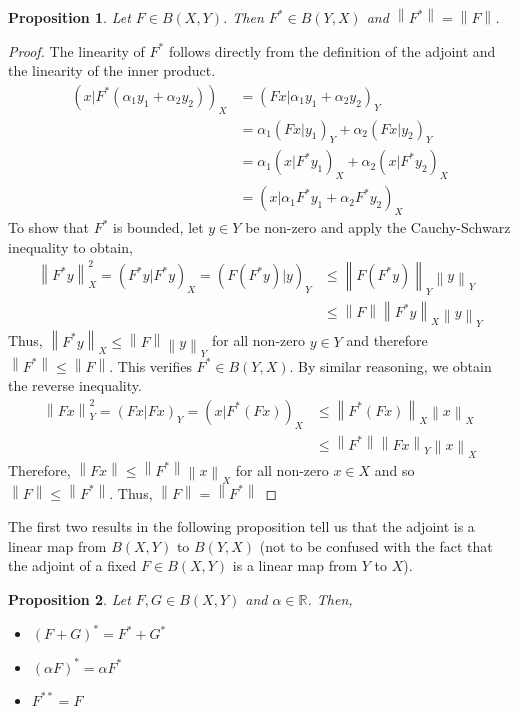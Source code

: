 \documentclass[12pt]{article}
\newcommand*{\norm}[1]{\left\lVert#1\right\rVert}
\newtheorem{prop}{Proposition}
\begin{document}
\begin{prop} 
Let $F \in B(X, Y)$. Then $F^* \in B(Y, X)$ and $\norm{F^*} = \norm{F}$. 
\end{prop}

\begin{proof} 
The linearity of $F^*$ follows directly from the definition of the adjoint and the linearity of the inner product. 
\begin{align*} 
(x|F^*(\alpha_1 y_1 + \alpha_2 y_2))_X &= (Fx|\alpha_1 y_1 + \alpha_2 y_2)_Y \\
                                                               &= \alpha_1(Fx|y_1)_Y + \alpha_2(Fx|y_2)_Y \\
                                                               &= \alpha_1(x|F^*y_1)_X + \alpha_2(x|F^*y_2)_X \\
                                                               &= (x|\alpha_1 F^*y_1 + \alpha_2 F^*y_2)_X
\end{align*} 
To show that $F^*$ is bounded, let $y \in Y$ be non-zero and apply the Cauchy-Schwarz inequality to obtain,
\begin{align*} 
\norm{F^*y}^2_X = (F^*y|F^*y)_X = (F(F^*y)|y)_Y &\leq \norm{F(F^*y)}_Y\norm{y}_Y \\
                                                                               &\leq \norm{F}\norm{F^*y}_X\norm{y}_Y
\end{align*}
Thus, $\norm{F^*y}_X \leq \norm{F}\norm{y}_Y$ for all non-zero $y \in Y$ and therefore $\norm{F^*} \leq \norm{F}$. 
This verifies $F^* \in B(Y, X)$. By similar reasoning, we obtain the reverse inequality. 
\begin{align*} 
\norm{Fx}^2_Y = (Fx|Fx)_Y = (x|F^*(Fx))_X &\leq \norm{F^*(Fx)}_X\norm{x}_X \\
                                                                      &\leq \norm{F^*}\norm{Fx}_Y\norm{x}_X
\end{align*}
Therefore, $\norm{Fx} \leq \norm{F^*}\norm{x}_X$ for all non-zero $x \in X$ and so $\norm{F} \leq \norm{F^*}$. 
Thus, $\norm{F} = \norm{F^*}$
\end{proof} 

The first two results in the following proposition tell us that the adjoint is a linear map from $B(X, Y)$
to $B(Y, X)$ (not to be confused with the fact that the adjoint of a fixed $F \in B(X, Y)$ is a linear map 
from $Y$ to $X$).

\begin{prop} 
Let $F, G \in B(X, Y)$ and $\alpha \in \mathbb{R}$. Then,
\begin{itemize}
\item $(F + G)^* = F^* + G^*$
\item $(\alpha F)^* = \alpha F^*$
\item $F^{**} = F$
\end{itemize}  
\end{prop}
\end{document}
